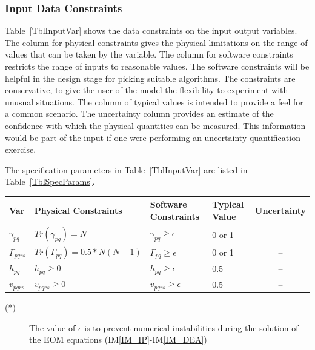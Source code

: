 \documentclass[12pt]{article}
\newcommand{\iref}[1]{IM\ref{#1}}
\begin{document}
\subsubsection{Input Data Constraints} \label{sec_DataConstraints}    

Table~\ref{TblInputVar} shows the data constraints on the input output
variables.  The column for physical constraints gives the physical limitations
on the range of values that can be taken by the variable.  The column for
software constraints restricts the range of inputs to reasonable values.  The
software constraints will be helpful in the design stage for picking suitable
algorithms.  The constraints are conservative, to give the user of the model the
flexibility to experiment with unusual situations.  The column of typical values
is intended to provide a feel for a common scenario.  The uncertainty column
provides an estimate of the confidence with which the physical quantities can be
measured.  This information would be part of the input if one were performing an
uncertainty quantification exercise.

The specification parameters in Table~\ref{TblInputVar} are listed in
Table~\ref{TblSpecParams}.

\begin{table}[!h]
  \caption{Input Variables} \label{TblInputVar}
  \renewcommand{\arraystretch}{1.2}
\noindent \begin{longtable*}{l l l l c} 
  \toprule
  \textbf{Var} & \textbf{Physical Constraints} & \textbf{Software Constraints} &
                             \textbf{Typical Value} & \textbf{Uncertainty}\\
  \midrule 
  $\gamma_{pq}$ & $Tr(\gamma_{pq}) = N$ & $\gamma_{pq} \ge \epsilon$ & 0 or 
  1 
  & 
  --\\
  $\Gamma_{pqrs}$ & $Tr(\Gamma_{pq})=0.5*N(N-1)$ & $\Gamma_{pq} \ge \epsilon$ & 
  0 
  or 
  1 & 
  --\\
  $h_{pq}$ & $h_{pq} \ge 0$ & $h_{pq} \ge \epsilon$ & 0.5 & --  \\
  $v_{pqrs}$ & $v_{pqrs} \ge 0$ & $v_{pqrs} \ge \epsilon$ & 0.5 & --  \\
  \bottomrule
\end{longtable*}
\end{table}

\noindent 
\begin{description}
\item[(*)] The value of $\epsilon$ is to prevent numerical instabilities during 
the solution of the EOM equations (\iref{IM_IP}-\iref{IM_DEA})
\end{description}
\end{document}
